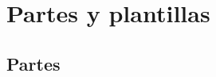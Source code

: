 
\chapter{Partes y plantillas}
\makeatletter
{}
\makeatother

\FloatBarrier
\section{Partes}\label{sec:partes}

